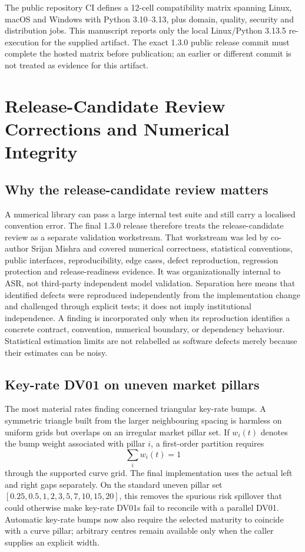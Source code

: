 \documentclass{asrpaper}
\begin{document}
The public repository CI defines a 12-cell compatibility matrix spanning Linux, macOS and Windows with Python 3.10--3.13, plus domain, quality, security and distribution jobs. This manuscript reports only the local Linux/Python 3.13.5 re-execution for the supplied artifact. The exact 1.3.0 public release commit must complete the hosted matrix before publication; an earlier or different commit is not treated as evidence for this artifact.


\section{Release-Candidate Review Corrections and Numerical Integrity}
\subsection{Why the release-candidate review matters}
A numerical library can pass a large internal test suite and still carry a localised convention error. The final 1.3.0 release therefore treats the release-candidate review as a separate validation workstream. That workstream was led by co-author Srijan Mishra and covered numerical correctness, statistical conventions, public interfaces, reproducibility, edge cases, defect reproduction, regression protection and release-readiness evidence. It was organizationally internal to ASR, not third-party independent model validation. Separation here means that identified defects were reproduced independently from the implementation change and challenged through explicit tests; it does not imply institutional independence. A finding is incorporated only when its reproduction identifies a concrete contract, convention, numerical boundary, or dependency behaviour. Statistical estimation limits are not relabelled as software defects merely because their estimates can be noisy.

\subsection{Key-rate DV01 on uneven market pillars}
The most material rates finding concerned triangular key-rate bumps. A symmetric triangle built from the larger neighbouring spacing is harmless on uniform grids but overlaps on an irregular market pillar set. If $w_i(t)$ denotes the bump weight associated with pillar $i$, a first-order partition requires
\begin{equation}
\sum_i w_i(t)=1
\end{equation}
through the supported curve grid. The final implementation uses the actual left and right gaps separately. On the standard uneven pillar set $[0.25,0.5,1,2,3,5,7,10,15,20]$, this removes the spurious risk spillover that could otherwise make key-rate DV01s fail to reconcile with a parallel DV01. Automatic key-rate bumps now also require the selected maturity to coincide with a curve pillar; arbitrary centres remain available only when the caller supplies an explicit width.
\end{document}
